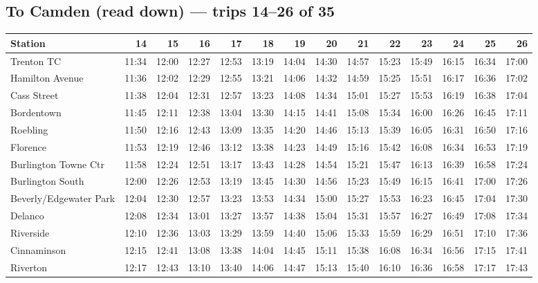 \subsection*{To Camden (read down) --- trips 14--26 of 35}
\begin{center}\footnotesize\setlength{\tabcolsep}{3pt}\begin{tabular}{@{}lrrrrrrrrrrrrr@{}}\toprule
Station & 14 & 15 & 16 & 17 & 18 & 19 & 20 & 21 & 22 & 23 & 24 & 25 & 26 \\\midrule
Trenton TC & 11:34 & 12:00 & 12:27 & 12:53 & 13:19 & 14:04 & 14:30 & 14:57 & 15:23 & 15:49 & 16:15 & 16:34 & 17:00 \\
Hamilton Avenue & 11:36 & 12:02 & 12:29 & 12:55 & 13:21 & 14:06 & 14:32 & 14:59 & 15:25 & 15:51 & 16:17 & 16:36 & 17:02 \\
Cass Street & 11:38 & 12:04 & 12:31 & 12:57 & 13:23 & 14:08 & 14:34 & 15:01 & 15:27 & 15:53 & 16:19 & 16:38 & 17:04 \\
Bordentown & 11:45 & 12:11 & 12:38 & 13:04 & 13:30 & 14:15 & 14:41 & 15:08 & 15:34 & 16:00 & 16:26 & 16:45 & 17:11 \\
Roebling & 11:50 & 12:16 & 12:43 & 13:09 & 13:35 & 14:20 & 14:46 & 15:13 & 15:39 & 16:05 & 16:31 & 16:50 & 17:16 \\
Florence & 11:53 & 12:19 & 12:46 & 13:12 & 13:38 & 14:23 & 14:49 & 15:16 & 15:42 & 16:08 & 16:34 & 16:53 & 17:19 \\
Burlington Towne Ctr & 11:58 & 12:24 & 12:51 & 13:17 & 13:43 & 14:28 & 14:54 & 15:21 & 15:47 & 16:13 & 16:39 & 16:58 & 17:24 \\
Burlington South & 12:00 & 12:26 & 12:53 & 13:19 & 13:45 & 14:30 & 14:56 & 15:23 & 15:49 & 16:15 & 16:41 & 17:00 & 17:26 \\
Beverly/Edgewater Park & 12:04 & 12:30 & 12:57 & 13:23 & 13:53 & 14:34 & 15:00 & 15:27 & 15:53 & 16:23 & 16:45 & 17:04 & 17:30 \\
Delanco & 12:08 & 12:34 & 13:01 & 13:27 & 13:57 & 14:38 & 15:04 & 15:31 & 15:57 & 16:27 & 16:49 & 17:08 & 17:34 \\
Riverside & 12:10 & 12:36 & 13:03 & 13:29 & 13:59 & 14:40 & 15:06 & 15:33 & 15:59 & 16:29 & 16:51 & 17:10 & 17:36 \\
Cinnaminson & 12:15 & 12:41 & 13:08 & 13:38 & 14:04 & 14:45 & 15:11 & 15:38 & 16:08 & 16:34 & 16:56 & 17:15 & 17:41 \\
Riverton & 12:17 & 12:43 & 13:10 & 13:40 & 14:06 & 14:47 & 15:13 & 15:40 & 16:10 & 16:36 & 16:58 & 17:17 & 17:43 \\

\end{tabular}
\end{center}
